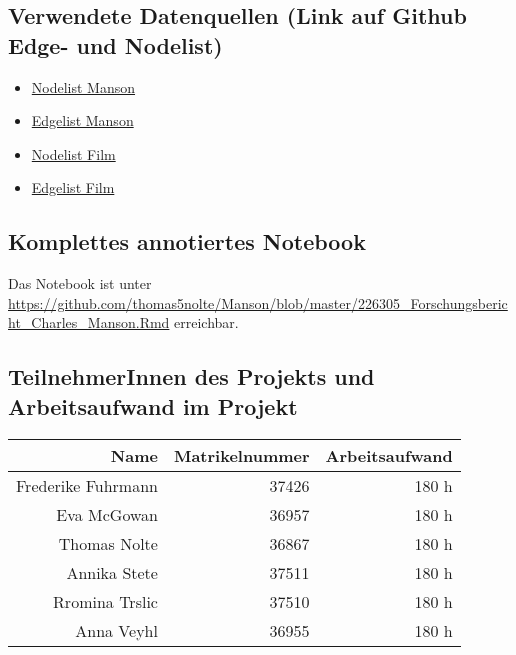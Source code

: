 \documentclass[
]{article}
\providecommand{\tightlist}{%
  \setlength{\itemsep}{0pt}\setlength{\parskip}{0pt}}
\begin{document}
\hypertarget{verwendete-datenquellen-link-auf-github-edge--und-nodelist}{%
\subsection{Verwendete Datenquellen (Link auf Github Edge- und
Nodelist)}\label{verwendete-datenquellen-link-auf-github-edge--und-nodelist}}

\begin{itemize}
\tightlist
\item
  \href{https://raw.githubusercontent.com/thomas5nolte/Manson/master/nl_manson.csv}{Nodelist
  Manson}
\item
  \href{https://raw.githubusercontent.com/thomas5nolte/Manson/master/el_manson.csv}{Edgelist
  Manson}
\item
  \href{https://raw.githubusercontent.com/thomas5nolte/Manson/master/nl_film.csv}{Nodelist
  Film}
\item
  \href{https://raw.githubusercontent.com/thomas5nolte/Manson/master/el_film.csv}{Edgelist
  Film}
\end{itemize}

\hypertarget{komplettes-annotiertes-notebook}{%
\subsection{Komplettes annotiertes
Notebook}\label{komplettes-annotiertes-notebook}}

Das Notebook ist unter
\url{https://github.com/thomas5nolte/Manson/blob/master/226305_Forschungsbericht_Charles_Manson.Rmd}
erreichbar.

\hypertarget{teilnehmerinnen-des-projekts-und-arbeitsaufwand-im-projekt}{%
\subsection{TeilnehmerInnen des Projekts und Arbeitsaufwand im
Projekt}\label{teilnehmerinnen-des-projekts-und-arbeitsaufwand-im-projekt}}

\begin{longtable}[]{@{}rrr@{}}
\toprule
Name & Matrikelnummer & Arbeitsaufwand\tabularnewline
\midrule
\endhead
Frederike Fuhrmann & 37426 & 180 h\tabularnewline
Eva McGowan & 36957 & 180 h\tabularnewline
Thomas Nolte & 36867 & 180 h\tabularnewline
Annika Stete & 37511 & 180 h\tabularnewline
Rromina Trslic & 37510 & 180 h\tabularnewline
Anna Veyhl & 36955 & 180 h\tabularnewline
\bottomrule
\end{longtable}
\end{document}
